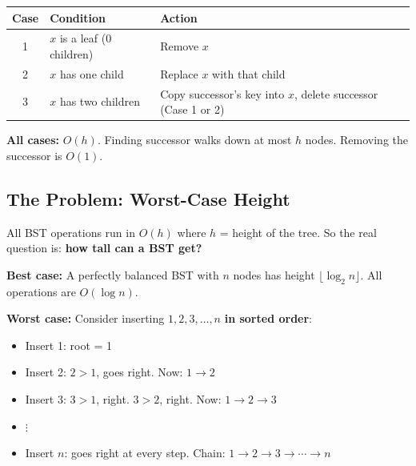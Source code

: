 \documentclass[11pt]{article}
\begin{document}
\begin{keybox}
\begin{center}
\renewcommand{\arraystretch}{1.5}
\begin{tabular}{c l l}
\textbf{Case} & \textbf{Condition} & \textbf{Action} \\
\hline
1 & $x$ is a \textcolor{rustW}{leaf} (0 children) & Remove $x$ \\
2 & $x$ has \textcolor{rustW}{one child} & Replace $x$ with that child \\
3 & $x$ has \textcolor{rustW}{two children} & Copy successor's key into $x$, delete successor (Case 1 or 2) \\
\end{tabular}
\end{center}

\textbf{All cases:} \textcolor{greenO}{$O(h)$}. Finding successor walks down at most $h$ nodes. Removing the successor is $O(1)$.
\end{keybox}

\subsection{The Problem: Worst-Case Height}

All BST operations run in $O(h)$ where $h$ = height of the tree. So the real question is: \textbf{how tall can a BST get?}

\textbf{Best case:} A perfectly balanced BST with $n$ nodes has height $\lfloor \log_2 n \rfloor$. All operations are $O(\log n)$.

\textbf{Worst case:} Consider inserting $1, 2, 3, \ldots, n$ \textbf{in sorted order}:

\begin{itemize}[leftmargin=1.4em,itemsep=2pt]
    \item Insert 1: root = 1
    \item Insert 2: $2 > 1$, goes right. Now: $1 \to 2$
    \item Insert 3: $3 > 1$, right. $3 > 2$, right. Now: $1 \to 2 \to 3$
    \item $\vdots$
    \item Insert $n$: goes right at every step. Chain: $1 \to 2 \to 3 \to \cdots \to n$
\end{itemize}

\begin{center}
\end{center}
\end{document}
